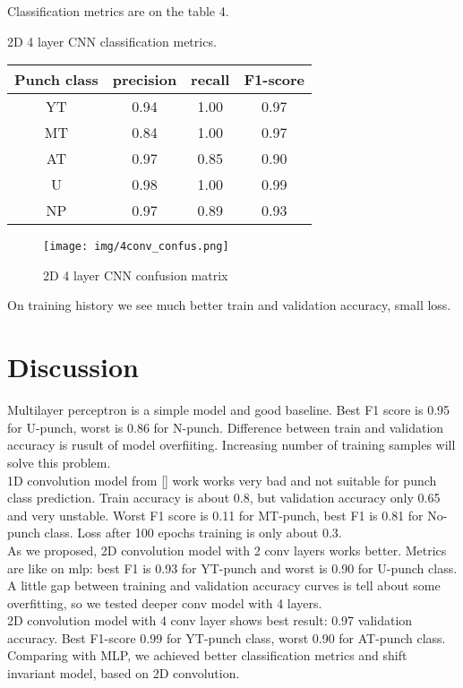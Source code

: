 \documentclass[sport,article,submit,moreauthors,pdftex]{Definitions/mdpi}
\begin{document}
Classification metrics are on the table 4.
\begin{specialtable}[H] 
\caption{2D 4 layer CNN classification metrics.\label{tab4}}
\begin{tabular}{cccc}
\toprule
\textbf{Punch class}	& \textbf{precision}	& \textbf{recall}	& \textbf{F1-score}\\
\midrule
YT		& 0.94		& 1.00		& 0.97 \\
MT		& 0.84		& 1.00		& 0.97 \\
AT		& 0.97		& 0.85		& 0.90 \\
U		& 0.98		& 1.00		& 0.99 \\
NP		& 0.97		& 0.89		& 0.93 \\
\bottomrule
\end{tabular}
\end{specialtable}

\begin{figure}[H]
\texttt{[image: img/4conv\_confus.png]}
\caption{2D 4 layer CNN confusion matrix}
\end{figure} 

On training history we see much better train and validation accuracy, small loss.


\section{Discussion}
Multilayer perceptron is a simple model and good baseline. Best F1 score is 0.95 for U-punch, worst is 0.86 for N-punch. Difference between train and validation accuracy is rusult of model overfiiting.
Increasing number of training samples will solve this problem.\\
1D convolution model from [] work works very bad and not suitable for punch class prediction. Train accuracy is about 0.8, but validation accuracy only 0.65 and very unstable. Worst F1 score is 0.11 for MT-punch, best F1 is 0.81 for No-punch class. Loss after 100 epochs training is only about 0.3.\\
As we proposed, 2D convolution model with 2 conv layers works better. Metrics are like on mlp: best F1 is 0.93 for YT-punch and worst is 0.90 for U-punch class. A little gap between training and validation accuracy curves is tell about some overfitting, so we tested deeper conv model with 4 layers.\\
2D convolution model with 4 conv layer shows best result: 0.97 validation accuracy. Best F1-score 0.99 for YT-punch class, worst 0.90 for AT-punch class.\\
Comparing with MLP, we achieved better classification metrics and shift invariant model, based on 2D convolution. 
\end{document}

